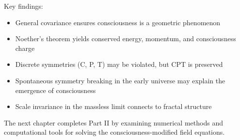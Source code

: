 Key findings:
\begin{itemize}
\item General covariance ensures consciousness is a geometric phenomenon
\item Noether's theorem yields conserved energy, momentum, and consciousness charge
\item Discrete symmetries (C, P, T) may be violated, but CPT is preserved
\item Spontaneous symmetry breaking in the early universe may explain the emergence of consciousness
\item Scale invariance in the massless limit connects to fractal structure
\end{itemize}

The next chapter completes Part II by examining numerical methods and computational tools for solving the consciousness-modified field equations.

